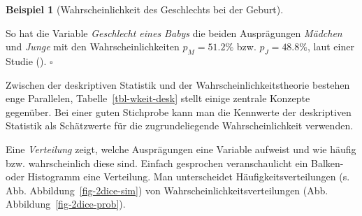 \documentclass[
  ngerman,
  letterpaper,
  twoside,
  open=any]{scrbook}
\theoremstyle{definition}
\newtheorem{example}{Beispiel}[chapter]
\theoremstyle{plain}
\theoremstyle{definition}
\theoremstyle{definition}
\theoremstyle{remark}
\begin{document}
\begin{example}[Wahrscheinlichkeit des Geschlechts bei der
Geburt]\protect\hypertarget{exm-babies}{}\label{exm-babies}

So hat die Variable \emph{Geschlecht eines Babys} die beiden
Ausprägungen \emph{Mädchen} und \emph{Junge} mit den
Wahrscheinlichkeiten \(p_M = 51.2\%\) bzw. \(p_J = 48.8\%\), laut einer
Studie (). \(\square\)

\end{example}

Zwischen der deskriptiven Statistik und der Wahrscheinlichkeitstheorie
bestehen enge Parallelen, Tabelle~\ref{tbl-wkeit-desk} stellt einige
zentrale Konzepte gegenüber. Bei einer guten Stichprobe kann man die
Kennwerte der deskriptiven Statistik als Schätzwerte für die
zugrundeliegende Wahrscheinlichkeit verwenden.

\begin{table}

\caption{\label{tbl-wkeit-desk}Gegenüberstellung von
Wahrscheinlichkeitstheorie und deskriptiver Statistik}


\end{table}%

Eine \emph{Verteilung} zeigt, welche Ausprägungen eine Variable aufweist
und wie häufig bzw. wahrscheinlich diese sind. Einfach gesprochen
veranschaulicht ein Balken- oder Histogramm eine Verteilung. Man
unterscheidet Häufigkeitsverteilungen (s. Abb.
Abbildung~\ref{fig-2dice-sim}) von Wahrscheinlichkeitsverteilungen (Abb.
Abbildung~\ref{fig-2dice-prob}).
\end{document}
